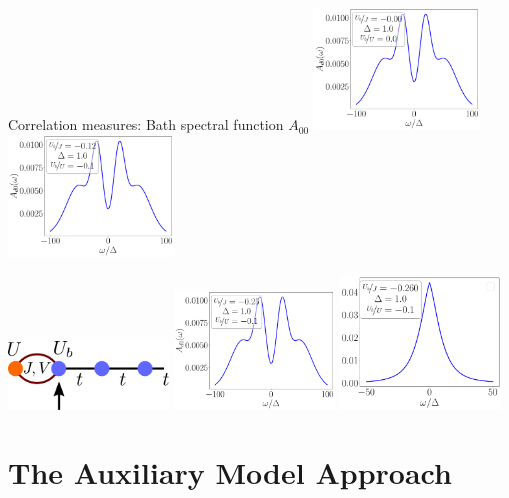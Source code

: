 \documentclass[aspectratio=169]{beamer}
\begin{document}
\begin{frame}[noframenumbering]{Correlation measures: Bath spectral function \(A_{00}\)}
\centering
\includegraphics[width=0.33\textwidth]{./figures/spec_func_00_Ub_by_J=-0.000.pdf}
\includegraphics[width=0.33\textwidth]{./figures/spec_func_00_Ub_by_J=-0.125.pdf}

\includegraphics[width=0.32\textwidth]{./figures/sf_pointer2.pdf}
\includegraphics[width=0.32\textwidth]{./figures/spec_func_00_Ub_by_J=-0.250.pdf}
\hspace*{\fill}
\includegraphics[width=0.32\textwidth]{./figures/spec_func_00_Ub_by_J=-0.26.pdf}
\hspace*{\fill}
\end{frame}

\section{The Auxiliary Model Approach}
\label{aux-method}
\end{document}
